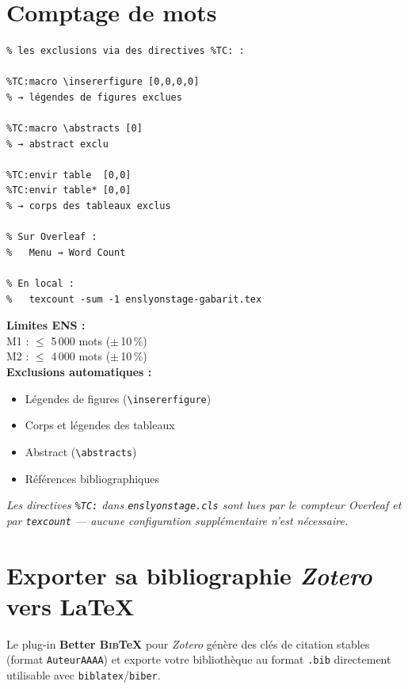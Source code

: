 \documentclass[12pt, a4paper]{article}
\newcommand{\BibTeX}{\textsc{Bib}\TeX}
\begin{document}
\section{Comptage de mots}

\begin{demo}
\begin{lstlisting}[style=latexcode]
% La classe gère automatiquement
% les exclusions via des directives %TC: :

%TC:macro \insererfigure [0,0,0,0]
% → légendes de figures exclues

%TC:macro \abstracts [0]
% → abstract exclu

%TC:envir table  [0,0]
%TC:envir table* [0,0]
% → corps des tableaux exclus

% Sur Overleaf :
%   Menu → Word Count

% En local :
%   texcount -sum -1 enslyonstage-gabarit.tex
\end{lstlisting}
\tcblower
\footnotesize\textbf{Limites ENS :}\\
M1 : $\leqslant$ 5\,000 mots ($\pm$\,10\,\%)\\
M2 : $\leqslant$ 4\,000 mots ($\pm$\,10\,\%)\\[8pt]
\textbf{Exclusions automatiques :}
\begin{itemize}[noitemsep, topsep=2pt]
  \item Légendes de figures (\texttt{\textbackslash insererfigure})
  \item Corps et légendes des tableaux
  \item Abstract (\texttt{\textbackslash abstracts})
  \item Références bibliographiques
\end{itemize}
\medskip
\itshape Les directives \texttt{\%TC:} dans \texttt{enslyonstage.cls} sont lues par le compteur Overleaf et par \texttt{texcount} — aucune configuration supplémentaire n'est nécessaire.
\end{demo}


\section{Exporter sa bibliographie \textit{Zotero} vers \LaTeX{}}
\label{sec:zotero}

Le plug-in \textbf{Better \BibTeX} pour \textit{Zotero} génère des clés de citation stables
(format \texttt{AuteurAAAA}) et exporte votre bibliothèque au format \texttt{.bib}
directement utilisable avec \texttt{biblatex}/\texttt{biber}.
\end{document}

